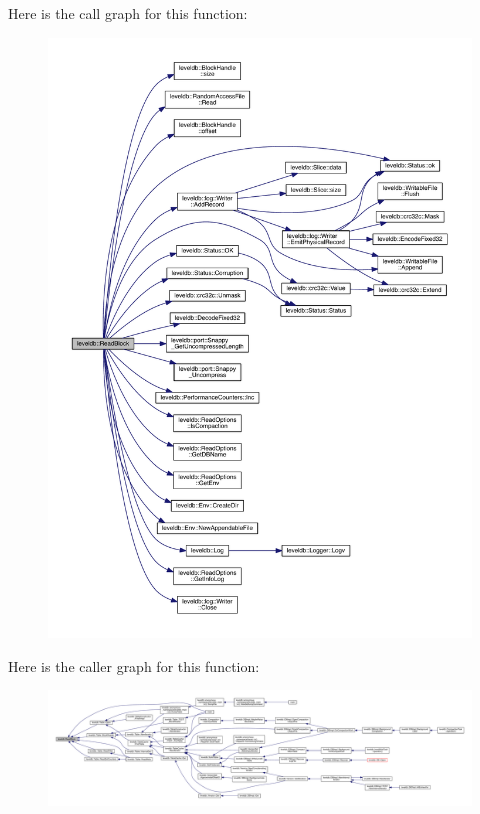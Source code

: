 Here is the call graph for this function\+:\nopagebreak
\begin{figure}[H]
\begin{center}
\leavevmode
\includegraphics[width=350pt]{namespaceleveldb_a63198fc7656081fd62695dade629790b_cgraph}
\end{center}
\end{figure}




Here is the caller graph for this function\+:
\nopagebreak
\begin{figure}[H]
\begin{center}
\leavevmode
\includegraphics[width=350pt]{namespaceleveldb_a63198fc7656081fd62695dade629790b_icgraph}
\end{center}
\end{figure}



